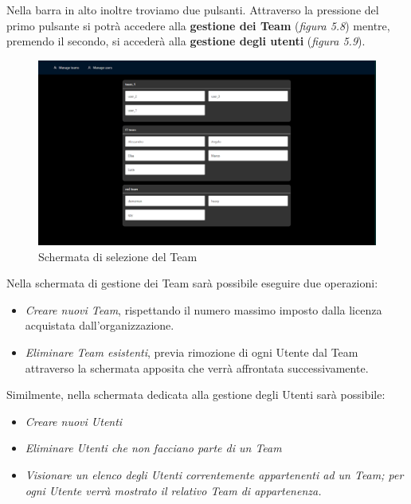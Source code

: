\noindent Nella barra in alto inoltre troviamo due pulsanti. Attraverso la pressione del primo pulsante si potrà accedere alla {\bf gestione dei Team} (\emph{figura 5.8}) mentre, premendo il secondo, si accederà alla {\bf gestione degli utenti} (\emph{figura 5.9}).
\vspace{8mm}
\begin{figure}[H]
    \centering
    \includegraphics[width=1.0\textwidth]{img/dashboard_teams_screenshot.png}
    \caption{Schermata di selezione del Team}
\end{figure}
\vspace{5mm}
\noindent Nella schermata di gestione dei Team sarà possibile eseguire due operazioni:
\begin{itemize}
    \item \emph{Creare nuovi Team}, rispettando il numero massimo imposto dalla licenza acquistata dall'organizzazione.
    \item \emph{Eliminare Team esistenti}, previa rimozione di ogni Utente dal Team attraverso la schermata apposita che verrà affrontata successivamente.
\end{itemize}
Similmente, nella schermata dedicata alla gestione degli Utenti sarà possibile:
\begin{itemize}
    \item \emph{Creare nuovi Utenti}
    \item \emph{Eliminare Utenti che non facciano parte di un Team}
    \item \emph{Visionare un elenco degli Utenti correntemente appartenenti ad un Team; per ogni Utente verrà mostrato il relativo Team di appartenenza.}
\end{itemize}
